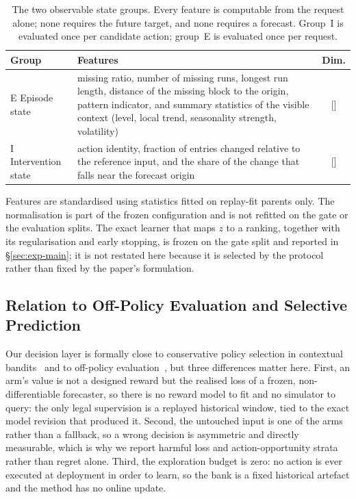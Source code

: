 \documentclass{article}
\newcommand{\ph}[1]{\textcolor{phgray}{\textsf{[\detokenize{#1}]}}}
\begin{document}
\begin{table}[h]
  \caption{The two observable state groups. Every feature is computable from the request
  alone; none requires the future target, and none requires a forecast. Group~I is evaluated
  once per candidate action; group~E is evaluated once per request.}
  \label{tab:app-features}
  \centering
  \small
  \setlength{\tabcolsep}{4pt}
\begin{tabular}{@{}l p{} c@{}}
    \toprule
    Group & Features & Dim. \\
    \midrule
    E Episode state      & missing ratio, number of missing runs, longest run length, distance of the missing block to the origin, pattern indicator, and summary statistics of the visible context (level, local trend, seasonality strength, volatility) & \ph{DIM_E} \\
    I Intervention state & action identity, fraction of entries changed relative to the reference input, and the share of the change that falls near the forecast origin & \ph{DIM_I} \\
    \bottomrule
  \end{tabular}
\end{table}

Features are standardised using statistics fitted on replay-fit parents only. The normalisation
is part of the frozen configuration and is not refitted on the gate or the evaluation splits.
The exact learner that maps $z$ to a ranking, together with its regularisation and early
stopping, is frozen on the gate split and reported in \S\ref{sec:exp-main}; it is not restated
here because it is selected by the protocol rather than fixed by the paper's formulation.


\subsection{Relation to Off-Policy Evaluation and Selective Prediction}
\label{app:ope-positioning}
Our decision layer is formally close to conservative policy selection in contextual
bandits~\citep{abbasiyadkori2011improved,lattimore2020bandit} and to off-policy
evaluation~\citep{strehl2010learning,dudik2011doubly,swaminathan2015counterfactual,
jiang2016doubly,thomas2016data}, but three differences matter here. First, an arm's value is
not a designed reward but the realised loss of a frozen, non-differentiable forecaster, so
there is no reward model to fit and no simulator to query: the only legal supervision is a
replayed historical window, tied to the exact model revision that produced it. Second, the
untouched input is one of the arms rather than a fallback, so a wrong decision is asymmetric
and directly measurable, which is why we report harmful loss and action-opportunity strata
rather than regret alone. Third, the exploration budget is zero: no action is ever executed at
deployment in order to learn, so the bank is a fixed historical artefact and the method has no
online update.
\end{document}
